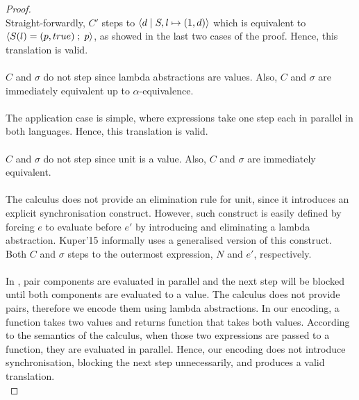 \documentclass[main.tex]{subfiles}
\begin{document}
\begin{proof}
  \\
  Straight-forwardly, $C'$ steps to $\langle {d}\;\vert\;{S, l \mapsto (1, d)} \rangle$ which
  is equivalent to $\langle {S(l) = (p, true)} \; ; \;{p} \rangle$, as showed in the last two
  cases of the proof. Hence, this translation is valid. \\
  

  \\
  $C$ and $\sigma$ do not step since lambda abstractions are values. Also, $C$
  and $\sigma$ are immediately equivalent up to $\alpha$-equivalence.\\


  \\
  The application case is simple, where expressions take one step each in
  parallel in both languages. Hence, this translation is valid. \\


  \\
  $C$ and $\sigma$ do not step since unit is a value. Also, $C$
  and $\sigma$ are immediately equivalent.\\


  \\
  The \lvar calculus does not provide an elimination rule for unit, since it
  introduces an explicit synchronisation construct. However, such construct is
  easily defined by forcing $e$ to evaluate before $e'$ by introducing and
  eliminating a lambda abstraction. Kuper'15 informally uses a generalised
  version of this construct. Both $C$ and $\sigma$ steps to the outermost
  expression, $N$ and $e'$, respectively.\\

  
   \\
  In \typedlvar, pair components are evaluated in parallel and the next step will
  be blocked until both components are evaluated to a value. The \lvar calculus
  does not provide pairs, therefore we encode them using lambda abstractions.
  In our encoding, a function takes two values and returns function that takes
  both values. According to the semantics of the \lvar \mspc calculus, when those two
  expressions are passed to a function, they are evaluated in parallel. Hence,
  our encoding does not introduce synchronisation, blocking the next step
  unnecessarily, and produces a valid translation. \\
  

\end{proof}
\end{document}
